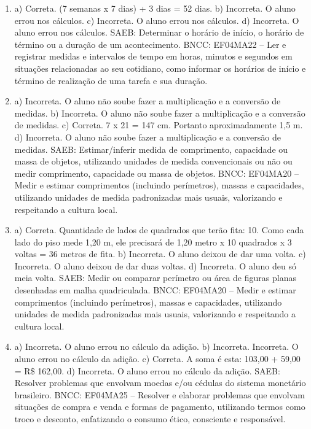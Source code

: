 \begin{enumerate}
\item
a) Correta. (7 semanas x 7 dias) + 3 dias = 52 dias.
b) Incorreta. O aluno errou nos cálculos.
c) Incorreta. O aluno errou nos cálculos.
d) Incorreta. O aluno errou nos cálculos.
SAEB: Determinar o horário de início, o horário de término ou
a duração de um acontecimento.
BNCC: EF04MA22 -- Ler e registrar medidas e intervalos de tempo em horas, minutos e segundos em
situações relacionadas ao seu cotidiano, como informar os horários de início e término de realização
de uma tarefa e sua duração.

\item
a) Incorreta. O aluno não soube fazer a multiplicação e a conversão de medidas.
b) Incorreta. O aluno não soube fazer a multiplicação e a conversão de medidas.
c) Correta. 7 x 21 = 147 cm. Portanto aproximadamente 1,5 m.
d) Incorreta. O aluno não soube fazer a multiplicação e a conversão de medidas.
SAEB: Estimar/inferir medida de comprimento, capacidade ou
massa de objetos, utilizando unidades de medida convencionais ou não ou
medir comprimento, capacidade ou massa de objetos.
BNCC: EF04MA20 -- Medir e estimar comprimentos (incluindo perímetros), massas e capacidades, utilizando
unidades de medida padronizadas mais usuais, valorizando e respeitando a cultura local.

\item
a) Correta. Quantidade de lados de quadrados que terão fita: 10. Como cada lado do piso mede 1,20 m, ele precisará de 1,20 metro x 10 quadrados x 3 voltas = 36 metros de fita.
b) Incorreta. O aluno deixou de dar uma volta.
c) Incorreta. O aluno deixou de dar duas voltas.
d) Incorreta. O aluno deu só meia volta.
SAEB: Medir ou comparar perímetro ou área de figuras planas
desenhadas em malha quadriculada.
BNCC: EF04MA20 -- Medir e estimar comprimentos (incluindo perímetros), massas e capacidades, utilizando
unidades de medida padronizadas mais usuais, valorizando e respeitando a cultura local.

\item
a) Incorreta. O aluno errou no cálculo da adição.
b) Incorreta. Incorreta. O aluno errou no cálculo da adição.
c) Correta. A soma é esta: 103,00 + 59,00 = R\$ 162,00.
d) Incorreta. O aluno errou no cálculo da adição.
SAEB: Resolver problemas que envolvam moedas e/ou cédulas do
sistema monetário brasileiro.
BNCC: EF04MA25 -- Resolver e elaborar problemas que envolvam situações de compra e venda e formas
de pagamento, utilizando termos como troco e desconto, enfatizando o consumo ético, consciente e
responsável.


\end{enumerate}

